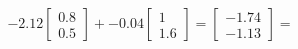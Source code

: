 \documentclass[preview]{standalone}
\begin{document}
\begin{align*}
-2.12 \begin{bmatrix} 0.8 \\ 0.5 \end{bmatrix} + -0.04 \begin{bmatrix} 1 \\ 1.6 \end{bmatrix} = \begin{bmatrix} -1.74 \\ -1.13 \end{bmatrix} =
\end{align*}
\end{document}
